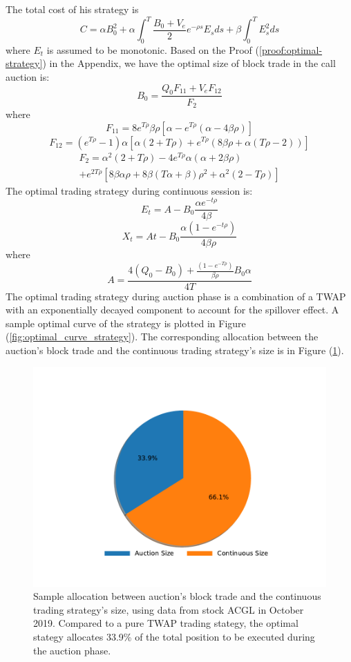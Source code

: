 \documentclass{article}
\begin{document}
The total cost of his strategy is
\[
  C = \alpha B_0^2  + \alpha \int_0^T \frac{B_0 + V_e}{2} e^{-\rho s} E_s ds + \beta \int_0^T E_s^2 ds
\]
where $E_t$ is assumed to be monotonic. Based on the Proof (\ref{proof:optimal-strategy}) in the Appendix, we have the optimal size of block trade in the call auction is:
\[
  B_0 = \frac{Q_0 F_{11} + V_e F_{12}}{F_2}
\]
where
\[
  F_{11} = 8 e^{T \rho} \beta \rho [\alpha - e^{T \rho} (\alpha - 4 \beta \rho)]
\]
\[
  F_{12} = (e^{T \rho}-1) \alpha [\alpha (2+T \rho) + e^{T \rho} (8 \beta \rho + \alpha (T \rho - 2 ))]
\]
\[
  \begin{split}
    F_2 = \alpha^2 (2 + T \rho) - 4 e^{T \rho} \alpha (\alpha + 2 \beta \rho)\ \\
    + e^{2 T \rho} [8 \beta \alpha \rho + 8 \beta (T \alpha + \beta) \rho^2 + \alpha^2 (2 - T \rho)]
  \end{split}
\]
The optimal trading strategy during continuous session is:
\[
  E_t = A - B_0 \frac{\alpha e^{-t \rho}}{4 \beta}
\]
\[
  X_t = A t - B_0 \frac{\alpha (1- e^{-t \rho})}{4 \beta \rho}
\]
where
\[
  A =   \frac{4 (Q_0 - B_0) + \frac{(1 - e^{-T \rho})}{\beta \rho} B_0 \alpha} {4 T}
\]
The optimal trading strategy during auction phase is a combination of a TWAP with an exponentially decayed component to account for the spillover effect. A sample optimal curve of the strategy is plotted in Figure (\ref{fig:optimal_curve_strategy}). The corresponding allocation between the auction's block trade and the continuous trading strategy's size is in Figure (\ref{fig:optimal_sizes}).

\begin{figure}[h]
  \includegraphics[width=\textwidth]{SampleTradeSize}
  \caption{Sample allocation between auction's block trade and the continuous trading strategy's size, using data from stock ACGL in October 2019. Compared to a pure TWAP trading stategy, the optimal stategy allocates 33.9\% of the total position to be executed during the auction phase.}
  \label{fig:optimal_sizes}
\end{figure}
\end{document}
